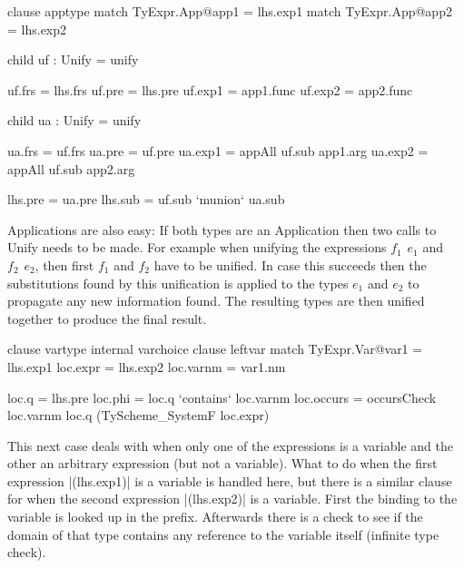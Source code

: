 \begin{code}
clause apptype
  match TyExpr.App@app1 = lhs.exp1
  match TyExpr.App@app2 = lhs.exp2
  
  child uf : Unify = unify
  
  uf.frs   = lhs.frs
  uf.pre   = lhs.pre
  uf.exp1  = app1.func
  uf.exp2  = app2.func
  
  child ua : Unify = unify
  
  ua.frs   = uf.frs
  ua.pre   = uf.pre
  ua.exp1  = appAll uf.sub app1.arg
  ua.exp2  = appAll uf.sub app2.arg
           
  lhs.pre  = ua.pre
  lhs.sub  = uf.sub `munion` ua.sub
\end{code}
Applications are also easy: If both types are an Application then two calls to Unify needs to be made. For example when unifying the expressions $f_1 \hspace{5pt} e_1$ and $f_2 \hspace{5pt} e_2$, then first $f_1$ and $f_2$ have to be unified. In case this succeeds then the substitutions found by this unification is applied to the types $e_1$ and $e_2$ to propagate any new information found. The resulting types are then unified together to produce the final result.

\begin{code}
clause vartype   
  internal varchoice
    clause leftvar
      match TyExpr.Var@var1 = lhs.exp1
      loc.expr  = lhs.exp2
      loc.varnm = var1.nm

      loc.q   = lhs.pre
      loc.phi = loc.q `contains` loc.varnm
      loc.occurs = occursCheck  loc.varnm loc.q 
                                (TyScheme_SystemF loc.expr)
\end{code}
This next case deals with when only one of the expressions is a variable and the other an arbitrary expression (but not a variable). What to do when the first expression |(lhs.exp1)| is a variable is handled here, but there is a similar clause for when the second expression |(lhs.exp2)| is a variable. 
First the binding to the variable is looked up in the prefix. Afterwards there is a check to see if the domain of that type contains any reference to the variable itself (infinite type check).
                           
